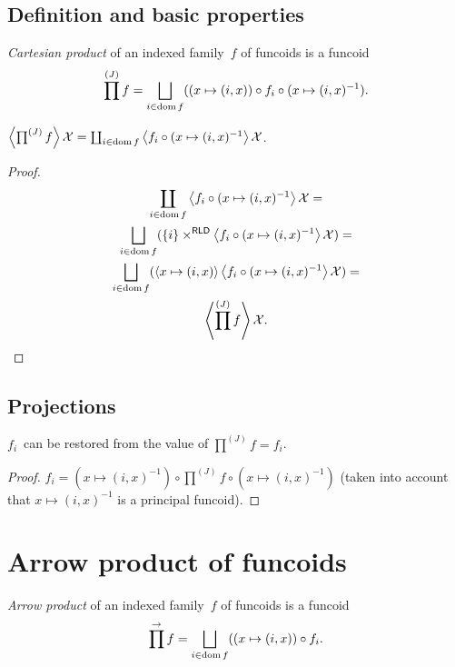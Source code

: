 \subsection{Definition and basic properties}

\begin{defn}
\emph{Cartesian product} of an indexed family~$f$ of funcoids is
a funcoid \[ \prod^{(J)} f=\bigsqcup_{i\in\dom f}((x\mapsto(i,x))\circ f_i\circ(x\mapsto(i,x)^{-1}). \]
\end{defn}

\begin{prop}
$\left\langle \prod^{(J)}f\right\rangle\mathcal{X}=\coprod_{i\in\operatorname{dom} f}\left\langle f_i\circ(x\mapsto(i,x)^{-1}\right\rangle\mathcal{X}$.
\end{prop}

\begin{proof}
\begin{multline*}
\coprod_{i\in\dom f}\supfun{f_i\circ(x\mapsto(i,x)^{-1}}\mathcal{X}=\\
\bigsqcup_{i\in\dom f}(\{i\}\times^{\mathsf{RLD}}\supfun{f_i\circ(x\mapsto(i,x)^{-1}}\mathcal{X})=\\
\bigsqcup_{i\in\dom f}(\supfun{x\mapsto(i,x)}\supfun{f_i\circ(x\mapsto(i,x)^{-1}}\mathcal{X})=\\
\supfun{\prod^{(J)}f}\mathcal{X}.
\end{multline*}
\end{proof}

\subsection{Projections}

\begin{thm}
$f_i$~can be restored from the value of $\prod^{(J)}f=f_i$.
\end{thm}

\begin{proof}
$f_i = (x\mapsto(i,x)^{-1})\circ\prod^{(J)}f\circ(x\mapsto(i,x)^{-1})$
(taken into account that $x\mapsto(i,x)^{-1}$ is a principal funcoid).
\end{proof}

\section{Arrow product of funcoids}

\begin{defn}
\emph{Arrow product} of an indexed family~$f$ of funcoids is
a funcoid \[ \prod^{\rightarrow} f=\bigsqcup_{i\in\dom f}((x\mapsto(i,x))\circ f_i. \]
\end{defn}

